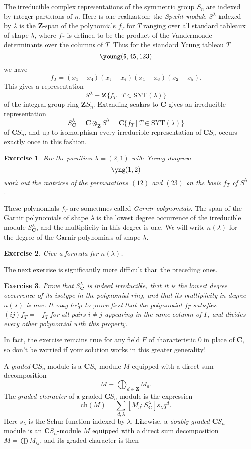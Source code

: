 \documentclass[12pt, reqno]{amsart}
\numberwithin{equation}{section}
\theoremstyle{definition}
\theoremstyle{plain}
\newtheorem{exercise}{Exercise}
\newcommand{\CC}{\mathbf{C}}
\newcommand{\ZZ}{\mathbf{Z}}
\begin{document}
The irreducible complex representations of the symmetric group $S_n$ are indexed by integer partitions of $n$. Here is one realization: the \emph{Specht module} $S^\lambda$ indexed by $\lambda$ is the $\ZZ$-span of the polynomials $f_T$ for $T$ ranging over all standard tableaux of shape $\lambda$, where $f_T$ is defined to be the product of the Vandermonde determinants over the columns of $T$. Thus for the standard Young tableau $T$
$$\young(6,45,123)$$ we have $$f_T=(x_1-x_4)(x_1-x_6)(x_4-x_6)(x_2-x_5).$$ This gives a representation $$S^\lambda= \ZZ \{ f_T \ \vert \ T \in \mathrm{SYT}(\lambda) \}$$ of the integral group ring $\ZZ S_n$. Extending scalars to $\CC$ gives an irreducible representation 
$$S^\lambda_\CC=\CC \otimes_\ZZ S^\lambda=\CC\{f_T \ | \ T \in \mathrm{SYT}(\lambda) \}$$ of $\CC S_n$, and up to isomorphism every irreducible representation of $\CC S_n$ occurs exactly once in this fashion.

\begin{exercise}
For the partition $\lambda=(2,1)$ with Young diagram $$\yng(1,2)$$ work out the matrices of the permutations $(12)$ and $(23)$ on the basis $f_T$ of $S^\lambda$. 
\end{exercise}

These polynomials $f_T$ are sometimes called \emph{Garnir polynomials}. The span of the Garnir polynomials of shape $\lambda$ is the lowest degree occurrence of the irreducible module $S^\lambda_\CC$, and the multiplicity in this degree is one. We will write $n(\lambda)$ for the degree of the Garnir polynomials of shape $\lambda$.

\begin{exercise}
Give a formula for $n(\lambda)$.	
\end{exercise}
The next exercise is significantly more difficult than the preceding ones.
\begin{exercise} \label{Garnir exercise}
Prove that $S^\lambda_\CC$ is indeed irreducible, that it is the lowest degree occurrence of its isotype in the polynomial ring, and that its multiplicity in degree $n(\lambda)$ is one. It may help to prove first that the polynomial $f_T$ satisfies
$(ij)f_T=-f_T$ for all pairs $i \neq j$ appearing in the same column of $T$, and divides every other polynomial with this property. 	
\end{exercise} In fact, the exercise remains true for any field $F$ of characteristic $0$ in place of $\CC$, so don't be worried if your solution works in this greater generality! 

A \emph{graded} $\CC S_n$-module is a $\CC S_n$-module $M$ equipped with a direct sum decomposition 
$$M=\bigoplus_{d \in \ZZ} M_d.$$ The \emph{graded character} of a graded $\CC S_n$-module is the expression
$$\mathrm{ch}(M)=\sum_{d,\lambda} [M_d:S^\lambda_\CC] s_\lambda q^d.$$ Here $s_\lambda$ is the Schur function indexed by $\lambda$. Likewise, a \emph{doubly graded} $\CC S_n$ module is an $\CC S_n$-module $M$ equipped with a direct sum decomposition $M=\bigoplus M_{ij}$, and its graded character is then
\end{document}
